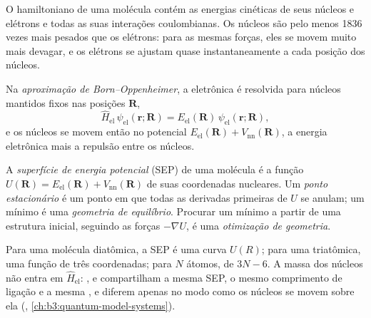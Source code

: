 O hamiltoniano de uma molécula contém as energias cinéticas de seus núcleos
e elétrons e todas as suas interações coulombianas. Os núcleos são pelo
menos 1836 vezes mais pesados que os elétrons: para as mesmas forças, eles
se movem muito mais devagar, e os elétrons se ajustam quase instantaneamente
a cada posição dos núcleos.

\begin{definition}\label{def:b3:computational-chemistry:born-oppenheimer}
Na \emph{aproximação de Born--Oppenheimer},
a  eletrônica é resolvida para núcleos
mantidos fixos nas posições $\mathbf R$,
\[
\hat H_{\mathrm{el}}\,\psi_{\mathrm{el}}(\mathbf r;\mathbf R) =
E_{\mathrm{el}}(\mathbf R)\,\psi_{\mathrm{el}}(\mathbf r;\mathbf R),
\]
e os núcleos se movem então no potencial $E_{\mathrm{el}}(\mathbf R) +
V_{\mathrm{nn}}(\mathbf R)$, a energia eletrônica mais a repulsão entre os
núcleos.
\end{definition}

\begin{definition}\label{def:b3:computational-chemistry:pes}
A \emph{superfície de energia potencial} (SEP) de
uma molécula é a função $U(\mathbf R) = E_{\mathrm{el}}(\mathbf R) +
V_{\mathrm{nn}}(\mathbf R)$ de suas coordenadas nucleares. Um \emph{ponto
estacionário} é um ponto em que todas as derivadas primeiras de $U$
se anulam; um mínimo é uma \emph{geometria de equilíbrio}.
Procurar um mínimo a partir de uma estrutura inicial, seguindo as
forças $-\nabla U$, é uma \emph{otimização de geometria}.
\end{definition}

Para uma molécula diatômica, a SEP é uma curva $U(R)$; para uma triatômica,
uma função de três coordenadas; para $N$ átomos, de $3N - 6$. A massa dos
núcleos não entra em $\hat H_{\mathrm{el}}$: ,  e  compartilham
a mesma SEP, o mesmo comprimento de ligação e a mesma , e
diferem apenas no modo como os núcleos se movem sobre ela (, \cref{ch:b3:quantum-model-systems}).

